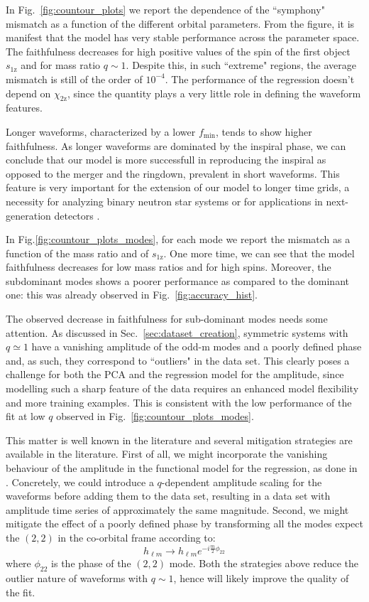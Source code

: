 \documentclass[twocolumn,showpacs,preprintnumbers,nofootinbib,prd,
superscriptaddress,10pt]{revtex4-2}
\begin{document}
In Fig.~\ref{fig:countour_plots} we report the dependence of the ``symphony" mismatch as a function of the different orbital parameters.
From the figure, it is manifest that the model has very stable performance across the parameter space.
The faithfulness decreases for high positive values of the spin of the first object $s_\text{1z}$ and for mass ratio $q\sim 1$. Despite this, in such ``extreme" regions, the average mismatch is still of the order of $10^{-4}$.
The performance of the regression doesn't depend on $\chi_\text{2z}$, since the quantity plays a very little role in defining the waveform features.

Longer waveforms, characterized by a lower $f_\textrm{min}$, tends to show higher faithfulness. As longer waveforms are dominated by the inspiral phase, we can conclude that our model is more successfull in reproducing the inspiral as opposed to the merger and the ringdown, prevalent in short waveforms.
This feature is very important for the extension of our model to longer time grids, a necessity for analyzing binary neutron star systems or for applications in next-generation detectors \cite{Purrer:2019jcp}.

In Fig.\ref{fig:countour_plots_modes}, for each mode we report the mismatch as a function of the mass ratio and of $s_\text{1z}$. One more time, we can see that the model faithfulness decreases for low mass ratios and for high spins. Moreover, the subdominant modes shows a poorer performance as compared to the dominant one: this was already observed in Fig.~\ref{fig:accuracy_hist}.

The observed decrease in faithfulness for sub-dominant modes needs some attention.
As discussed in Sec.~\ref{sec:dataset_creation}, symmetric systems with $q \simeq 1$ have a vanishing amplitude of the odd-m modes and a poorly defined phase and, as such, they correspond to ``outliers" in the data set. This clearly poses a challenge for both the PCA and the regression model for the amplitude, since modelling such a sharp feature of the data requires an enhanced model flexibility and more training examples.
This is consistent with the low performance of the fit at low $q$ observed in Fig.~\ref{fig:countour_plots_modes}.

This matter is well known in the literature and several mitigation strategies are available in the literature.
First of all, we might incorporate the vanishing behaviour of the amplitude in the functional model for the regression, as done in \cite{Blackman:2015pia}. Concretely, we could introduce a $q$-dependent amplitude scaling for the waveforms before adding them to the data set, resulting in a data set with amplitude time series of approximately the same magnitude.
Second, we might mitigate the effect of a poorly defined phase by transforming all the modes expect the $(2,2)$ in the co-orbital frame \cite{Varma:2018mmi} according to:
\begin{equation}
	h_{\ell m} \rightarrow h_{\ell m} e^{-i\frac{m}{2}\phi_{22}}
\end{equation}
where $\phi_{22}$ is the phase of the $(2,2)$ mode.
Both the strategies above reduce the outlier nature of waveforms with $q \sim 1$, hence will likely improve the quality of the fit.
\end{document}
